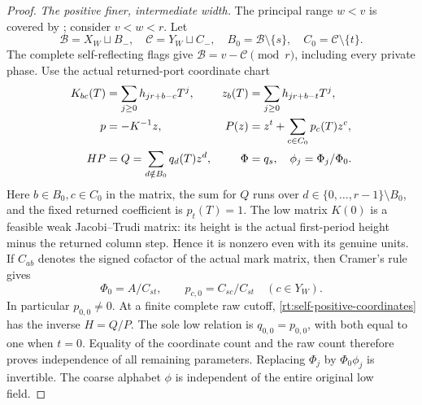 \documentclass[11pt,a4paper]{amsart}
\numberwithin{equation}{section}
\theoremstyle{plain}
\theoremstyle{definition}
\begin{document}
\begin{proof}
\smallskip\noindent\emph{The positive finer, intermediate width.}
The principal range \(w<v\) is covered by ;
consider \(v<w<r\).  Let
\[
 \mathcal B=X_W\sqcup B_-,\quad \mathcal C=Y_W\sqcup C_-,\quad
 B_0=\mathcal B\setminus\{s\},\quad
 C_0=\mathcal C\setminus\{t\}.
\]
The complete self-reflecting flags give
\(\mathcal B=v-\mathcal C\pmod r\), including every private phase.
Use the actual returned-port coordinate chart
\begin{align}
 K_{bc}(T)&=\sum_{j\ge0}h_{jr+b-c}T^j,&
 z_b(T)&=\sum_{j\ge0}h_{jr+b-t}T^j,\notag\\
 p&=-K^{-1}z,&
 P(z)&=z^t+\sum_{c\in C_0}p_c(T)z^c,\label{rt:self-positive-coordinates}\\
 HP&=Q=\sum_{d\notin B_0}q_d(T)z^d,&
 \Phi&=q_s,\quad \phi_j=\Phi_j/\Phi_0.\notag
\end{align}
Here \(b\in B_0,c\in C_0\) in the matrix, the sum for \(Q\) runs
over \(d\in\{0,\ldots,r-1\}\setminus B_0\), and the fixed
returned coefficient is \(p_t(T)=1\).
The low matrix \(K(0)\) is a feasible weak Jacobi--Trudi matrix:
its height is the actual first-period height minus the returned
column step.  Hence it is nonzero even with its genuine units.
If \(C_{ab}\) denotes the signed cofactor of the actual mark matrix,
then Cramer's rule gives
\begin{equation}\label{rt:self-low-values}
 \Phi_0=A/C_{st},\qquad p_{c,0}=C_{sc}/C_{st}\quad(c\in Y_W).
\end{equation}
In particular \(p_{0,0}\ne0\).  At a finite complete raw cutoff,
\eqref{rt:self-positive-coordinates} has the inverse \(H=Q/P\).
The sole low relation is \(q_{0,0}=p_{0,0}\), with both equal to one
when \(t=0\).  Equality of the coordinate count and the raw count
therefore proves independence of all remaining parameters.  Replacing
\(\Phi_j\) by \(\Phi_0\phi_j\) is invertible.  The coarse alphabet
\(\phi\) is independent of the entire original low field.


\end{proof}
\end{document}
